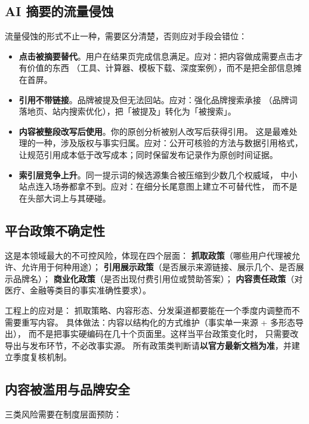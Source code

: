 \subsection{AI 摘要的流量侵蚀}

流量侵蚀的形式不止一种，需要区分清楚，否则应对手段会错位：

\begin{itemize}
  \item \textbf{点击被摘要替代}。用户在结果页完成信息满足。应对：把内容做成需要点击才有价值的东西
        （工具、计算器、模板下载、深度案例），而不是把全部信息摊在首屏。
  \item \textbf{引用不带链接}。品牌被提及但无法回站。应对：强化品牌搜索承接
        （品牌词落地页、站内搜索优化），把「被提及」转化为「被搜索」。
  \item \textbf{内容被整段改写后使用}。你的原创分析被别人改写后获得引用。
        这是最难处理的一种，涉及版权与事实归属。应对：公开可核验的方法与数据引用格式，
        让规范引用成本低于改写成本；同时保留发布记录作为原创时间证据。
  \item \textbf{索引层竞争上升}。同一提示词的候选源集合被压缩到少数几个权威域，
        中小站点连入场券都拿不到。应对：在细分长尾意图上建立不可替代性，
        而不是在头部大词上与其硬碰。
\end{itemize}

\subsection{平台政策不确定性}

这是本领域最大的不可控风险，体现在四个层面：
\textbf{抓取政策}（哪些用户代理被允许、允许用于何种用途）；
\textbf{引用展示政策}（是否展示来源链接、展示几个、是否展示品牌名）；
\textbf{商业化政策}（是否出现付费引用位或赞助答案）；
\textbf{内容责任政策}（对医疗、金融等类目的事实准确性要求）。

工程上的应对是：
抓取策略、内容形态、分发渠道都要能在一个季度内调整而不需要重写内容。
具体做法：内容以结构化的方式维护（事实单一来源 + 多形态导出），
而不是把事实硬编码在几十个页面里。这样当平台政策变化时，
只需要改导出与发布环节，不必改事实源。
所有政策类判断请\textbf{以官方最新文档为准}，并建立季度复核机制。

\subsection{内容被滥用与品牌安全}

三类风险需要在制度层面预防：

